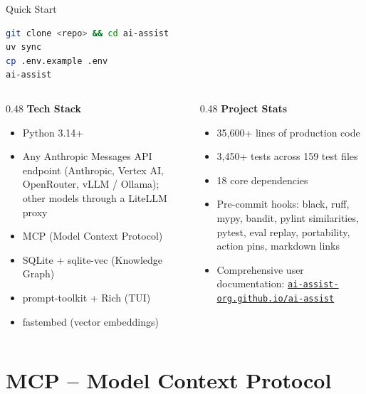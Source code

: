 \documentclass[aspectratio=169,10pt]{beamer}
\begin{document}
\begin{frame}[fragile]{Quick Start}
\begin{lstlisting}[style=code,language=bash,title={\scriptsize Setup}]
git clone <repo> && cd ai-assist
uv sync
cp .env.example .env
ai-assist
\end{lstlisting}

\vfill
\begin{columns}[T]
\begin{column}{0.48\textwidth}
\textbf{Tech Stack}
\begin{itemize}\scriptsize
  \item Python 3.14+
  \item Any Anthropic Messages API endpoint (Anthropic, Vertex AI, OpenRouter, vLLM / Ollama); other models through a LiteLLM proxy
  \item MCP (Model Context Protocol)
  \item SQLite + sqlite-vec (Knowledge Graph)
  \item prompt-toolkit + Rich (TUI)
  \item fastembed (vector embeddings)
\end{itemize}
\end{column}
\begin{column}{0.48\textwidth}
\textbf{Project Stats}
\begin{itemize}\scriptsize
  \item 35,600+ lines of production code
  \item 3,450+ tests across 159 test files
  \item 18 core dependencies
  \item Pre-commit hooks: black, ruff, mypy, bandit, pylint similarities, pytest, eval replay, portability, action pins, markdown links
  \item Comprehensive user documentation: \href{https://ai-assist-org.github.io/ai-assist/}{\texttt{ai-assist-org.github.io/ai-assist}}
\end{itemize}
\end{column}
\end{columns}
\end{frame}

\section{MCP -- Model Context Protocol}
\end{document}
